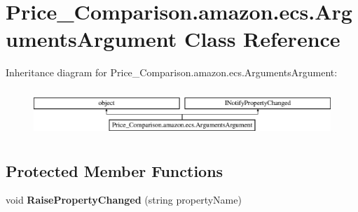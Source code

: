 \hypertarget{class_price___comparison_1_1amazon_1_1ecs_1_1_arguments_argument}{\section{Price\-\_\-\-Comparison.\-amazon.\-ecs.\-Arguments\-Argument Class Reference}
\label{class_price___comparison_1_1amazon_1_1ecs_1_1_arguments_argument}
}


 


Inheritance diagram for Price\-\_\-\-Comparison.\-amazon.\-ecs.\-Arguments\-Argument\-:\begin{figure}[H]
\begin{center}
\leavevmode
\includegraphics[height=1.789137cm]{class_price___comparison_1_1amazon_1_1ecs_1_1_arguments_argument}
\end{center}
\end{figure}
\subsection*{Protected Member Functions}
\begin{DoxyCompactItemize}
\item 
\hypertarget{class_price___comparison_1_1amazon_1_1ecs_1_1_arguments_argument_a4b91beefea11a0a0e8e47d7daa7931d2}{void {\bfseries Raise\-Property\-Changed} (string property\-Name)}\label{class_price___comparison_1_1amazon_1_1ecs_1_1_arguments_argument_a4b91beefea11a0a0e8e47d7daa7931d2}

\end{DoxyCompactItemize}
